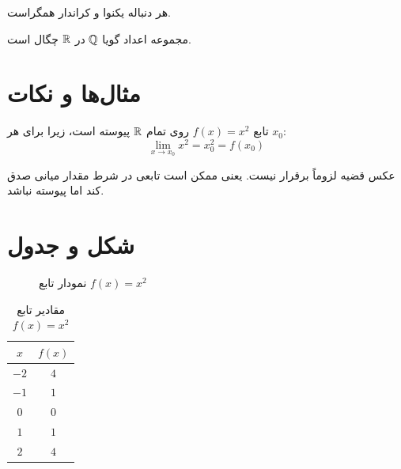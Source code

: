 \documentclass{matinbook}
\begin{document}
\begin{corollary}
    هر دنباله یکنوا و کراندار همگراست.
    \label{cor:monotone-convergence}
\end{corollary}

\begin{proposition}
    مجموعه اعداد گویا $\mathbb{Q}$ در $\mathbb{R}$ چگال است.
    \label{prop:q-dense}
\end{proposition}

\section{مثال‌ها و نکات}

\begin{example}
    تابع $f(x) = x^{2}$ روی تمام $\mathbb{R}$ پیوسته است،
    زیرا برای هر $x_{0}$:
    \[
        \lim_{x \to x_{0}} x^{2} = x_{0}^{2} = f(x_{0})
    \]
    \label{ex:continuous-function}
\end{example}

\begin{remark}
    عکس قضیه  لزوماً برقرار نیست.
    یعنی ممکن است تابعی در شرط مقدار میانی صدق کند
    اما پیوسته نباشد.
    \label{rem:ivt-converse}
\end{remark}

\section{شکل و جدول}

\begin{figure}[h]
\centering
\begin{latin}
\end{latin}
\caption{نمودار تابع $f(x) = x^{2}$}
\label{fig:parabola}
\end{figure}

\begin{table}[h]
\centering
\caption{مقادیر تابع $f(x) = x^{2}$}
\label{tab:parabola-values}
\begin{tabular}{|c|c|}
\hline
\textbf{$x$} & \textbf{$f(x)$} \\
\hline
$-2$ & $4$ \\
$-1$ & $1$ \\
$0$ & $0$ \\
$1$ & $1$ \\
$2$ & $4$ \\
\hline
\end{tabular}
\end{table}
\end{document}

